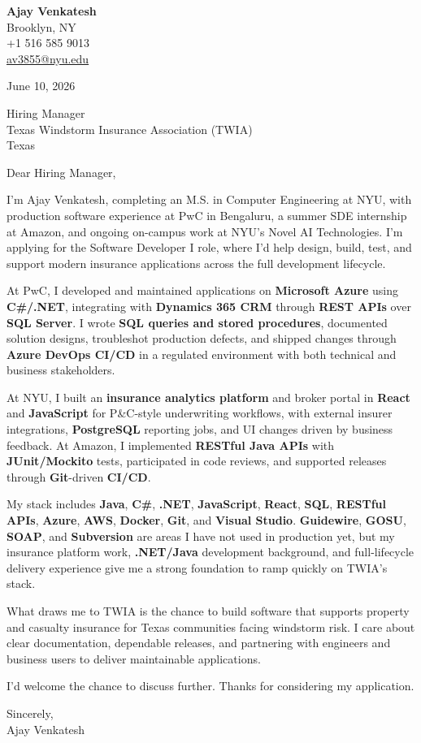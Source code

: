 \documentclass[letterpaper,11pt]{article}
\begin{document}
\begin{flushleft}
\textbf{\large Ajay Venkatesh} \\
Brooklyn, NY \\
+1 516 585 9013 \\
\href{mailto:av3855@nyu.edu}{av3855@nyu.edu}
\end{flushleft}
\vspace{10pt}
June 10, 2026
\vspace{6pt}

Hiring Manager \\
Texas Windstorm Insurance Association (TWIA) \\
Texas

\vspace{10pt}

Dear Hiring Manager,

I'm Ajay Venkatesh, completing an M.S. in Computer Engineering at NYU, with production software experience at PwC in Bengaluru, a summer SDE internship at Amazon, and ongoing on-campus work at NYU's Novel AI Technologies. I'm applying for the Software Developer I role, where I'd help design, build, test, and support modern insurance applications across the full development lifecycle.

At PwC, I developed and maintained applications on \textbf{Microsoft Azure} using \textbf{C\#/.NET}, integrating with \textbf{Dynamics 365 CRM} through \textbf{REST APIs} over \textbf{SQL Server}. I wrote \textbf{SQL queries and stored procedures}, documented solution designs, troubleshot production defects, and shipped changes through \textbf{Azure DevOps CI/CD} in a regulated environment with both technical and business stakeholders.

At NYU, I built an \textbf{insurance analytics platform} and broker portal in \textbf{React} and \textbf{JavaScript} for P\&C-style underwriting workflows, with external insurer integrations, \textbf{PostgreSQL} reporting jobs, and UI changes driven by business feedback. At Amazon, I implemented \textbf{RESTful Java APIs} with \textbf{JUnit/Mockito} tests, participated in code reviews, and supported releases through \textbf{Git}-driven \textbf{CI/CD}.

My stack includes \textbf{Java}, \textbf{C\#}, \textbf{.NET}, \textbf{JavaScript}, \textbf{React}, \textbf{SQL}, \textbf{RESTful APIs}, \textbf{Azure}, \textbf{AWS}, \textbf{Docker}, \textbf{Git}, and \textbf{Visual Studio}. \textbf{Guidewire}, \textbf{GOSU}, \textbf{SOAP}, and \textbf{Subversion} are areas I have not used in production yet, but my insurance platform work, \textbf{.NET/Java} development background, and full-lifecycle delivery experience give me a strong foundation to ramp quickly on TWIA's stack.

What draws me to TWIA is the chance to build software that supports property and casualty insurance for Texas communities facing windstorm risk. I care about clear documentation, dependable releases, and partnering with engineers and business users to deliver maintainable applications.

I'd welcome the chance to discuss further. Thanks for considering my application.

\vspace{12pt}
Sincerely, \\
Ajay Venkatesh
\end{document}
